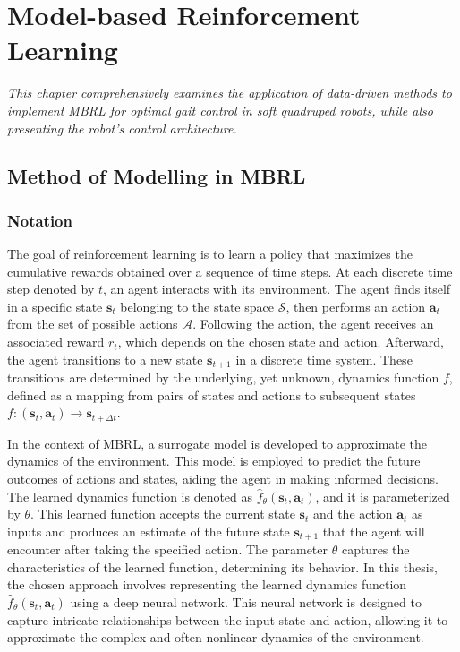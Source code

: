 \chapter{Model-based Reinforcement Learning}
\label{chap4}
\textit{This chapter comprehensively examines the application of data-driven methods to implement \ac{MBRL} for optimal gait control in soft quadruped robots, while also presenting the robot's control architecture.}

\section{Method of Modelling in MBRL}
\subsection{Notation}
The goal of reinforcement learning is to learn a policy that maximizes the cumulative rewards obtained over a sequence of time steps. At each discrete time step denoted by $t$, an agent interacts with its environment. The agent finds itself in a specific state $\mathbf{s}_t$ belonging to the state space $\mathcal{S}$, then performs an action $\mathbf{a}_t$ from the set of possible actions $\mathcal{A}$. Following the action, the agent receives an associated reward $r_t$, which depends on the chosen state and action. Afterward, the agent transitions to a new state $\mathbf{s}_{t+1}$ in a discrete time system. These transitions are determined by the underlying, yet unknown, dynamics function $f$, defined as a mapping from pairs of states and actions to subsequent states $f: (\mathbf{s}_t, \mathbf{a}_t) \rightarrow \mathbf{s}_{t+\Delta t}$. 

In the context of \ac{MBRL}, a surrogate model is developed to approximate the dynamics of the environment. This model is employed to predict the future outcomes of actions and states, aiding the agent in making informed decisions. The learned dynamics function is denoted as $\hat{f}_\theta(\mathbf{s}_t, \mathbf{a}_t)$, and it is parameterized by $\theta$. This learned function accepts the current state $\mathbf{s}_t$ and the action $\mathbf{a}_t$ as inputs and produces an estimate of the future state $\mathbf{s}_{t+1}$ that the agent will encounter after taking the specified action. The parameter $\theta$ captures the characteristics of the learned function, determining its behavior. In this thesis, the chosen approach involves representing the learned dynamics function $\hat{f}_\theta(\mathbf{s}_t, \mathbf{a}_t)$ using a deep neural network. This neural network is designed to capture intricate relationships between the input state and action, allowing it to approximate the complex and often nonlinear dynamics of the environment. 

